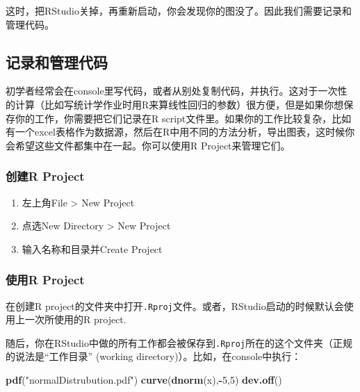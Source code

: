 \documentclass[]{book}
\newenvironment{Shaded}{\begin{snugshade}}{\end{snugshade}}
\newcommand{\DecValTok}[1]{\textcolor[rgb]{0.00,0.00,0.81}{#1}}
\newcommand{\KeywordTok}[1]{\textcolor[rgb]{0.13,0.29,0.53}{\textbf{#1}}}
\newcommand{\NormalTok}[1]{#1}
\newcommand{\OperatorTok}[1]{\textcolor[rgb]{0.81,0.36,0.00}{\textbf{#1}}}
\newcommand{\StringTok}[1]{\textcolor[rgb]{0.31,0.60,0.02}{#1}}
\providecommand{\tightlist}{%
  \setlength{\itemsep}{0pt}\setlength{\parskip}{0pt}}
\begin{document}
这时，把RStudio关掉，再重新启动，你会发现你的图没了。因此我们需要记录和管理代码。

\hypertarget{manage}{%
\subsection{记录和管理代码}\label{manage}}

初学者经常会在console里写代码，或者从别处复制代码，并执行。这对于一次性的计算（比如写统计学作业时用R来算线性回归的参数）很方便，但是如果你想保存你的工作，你需要把它们记录在R script文件里。如果你的工作比较复杂，比如有一个excel表格作为数据源，然后在R中用不同的方法分析，导出图表，这时候你会希望这些文件都集中在一起。你可以使用R Project来管理它们。

\hypertarget{r-project}{%
\subsubsection{创建R Project}\label{r-project}}

\begin{enumerate}
\def\labelenumi{\arabic{enumi}.}
\tightlist
\item
  左上角File \textgreater{} New Project
\item
  点选New Directory \textgreater{} New Project
\item
  输入名称和目录并Create Project
\end{enumerate}

\hypertarget{r-project}{%
\subsubsection{使用R Project}\label{r-project}}

在创建R project的文件夹中打开\texttt{.Rproj}文件。或者，RStudio启动的时候默认会使用上一次所使用的R project.

随后，你在RStudio中做的所有工作都会被保存到\texttt{.Rproj}所在的这个文件夹（正规的说法是``工作目录'' (working directory)）。比如，在console中执行：

\begin{Shaded}
\begin{Highlighting}[]
\KeywordTok{pdf}\NormalTok{(}\StringTok{"normalDistrubution.pdf"}\NormalTok{)}
\KeywordTok{curve}\NormalTok{(}\KeywordTok{dnorm}\NormalTok{(x),}\OperatorTok{-}\DecValTok{5}\NormalTok{,}\DecValTok{5}\NormalTok{)}
\KeywordTok{dev.off}\NormalTok{()}
\end{Highlighting}
\end{Shaded}
\end{document}
